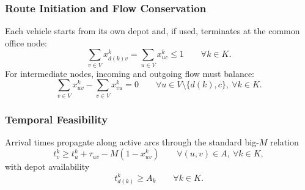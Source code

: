 \documentclass[11pt,a4paper]{article}
\begin{document}
\subsubsection{Route Initiation and Flow Conservation}
Each vehicle starts from its own depot and, if used, terminates at the common office node:
\begin{equation}
\sum_{v\in V} x_{d(k)v}^k
=
\sum_{u\in V} x_{uc}^k
\le 1
\qquad \forall k\in K .
\label{eq:start-end}
\end{equation}
For intermediate nodes, incoming and outgoing flow must balance:
\begin{equation}
\sum_{v\in V} x_{uv}^k - \sum_{v\in V} x_{vu}^k = 0
\qquad \forall u\in V\setminus\{d(k),c\},\ \forall k\in K .
\label{eq:flow}
\end{equation}

\subsubsection{Temporal Feasibility}
Arrival times propagate along active arcs through the standard big-$M$ relation
\begin{equation}
t_v^k \ge t_u^k + \tau_{uv} - M(1-x_{uv}^k)
\qquad \forall (u,v)\in A,\ \forall k\in K ,
\label{eq:time-prop}
\end{equation}
with depot availability
\begin{equation}
t_{d(k)}^k \ge A_k
\qquad \forall k\in K .
\label{eq:depot-start}
\end{equation}
\end{document}
